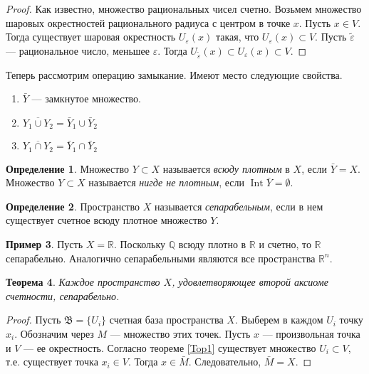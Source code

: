 \documentclass[12pt, titlepage, oneside]{amsbook}
\newcommand{\Int}{\operatorname{Int}}
\newcommand{\RR}{\mathbb{R}}
\newcommand{\QQ}{\mathbb{Q}}
\newcommand{\BBB}{\mathfrak{B}}
\newtheorem{theorem}{Теорема}[chapter]
\theoremstyle{definition}
\newtheorem{example}[theorem]{Пример}
\newtheorem{definition}[theorem]{Определение}
\theoremstyle{remark}
\begin{document}
\begin{proof}
	Как известно, множество рациональных чисел счетно. Возьмем множество шаровых окрестностей рационального радиуса с центром в точке $x$. Пусть $x\in V$. Тогда существует шаровая окрестность $U_{\varepsilon}(x)$ такая, что $U_{\varepsilon}(x)\subset V$. Пусть $\tilde{\varepsilon}$ --- рациональное число, меньшее $\varepsilon$. Тогда $U_{\tilde{\varepsilon}}(x)\subset U_{\varepsilon}(x)\subset V$.
\end{proof}

Теперь рассмотрим операцию замыкание. Имеют место следующие свойства.
\begin{enumerate}
	\item $\bar{Y}$ --- замкнутое множество.
	\item $\overline{Y_1\cup Y_2}=\bar{Y}_1\cup\bar{Y}_2$
	\item $\overline{Y_1\cap Y_2}=\bar{Y}_1\cap\bar{Y}_2$
\end{enumerate}

\begin{definition}
	Множество $Y\subset X$ называется \emph{всюду плотным} в $X$, если $\bar{Y}=X$. Множество $Y\subset X$ называется \emph{нигде не плотным}, если $\Int\bar{Y}=\emptyset$.
\end{definition}

\begin{definition}
	Пространство $X$ называется \emph{сепарабельным}, если в нем существует счетное всюду плотное множество $Y$.
\end{definition}

\begin{example}
	Пусть $X=\RR$. Поскольку $\QQ$ всюду плотно в $\RR$ и счетно, то $\RR$ сепарабельно. Аналогично сепарабельными являются все пространства $\RR^n$.
\end{example}

\begin{theorem}
	\label{Met7}
	Каждое пространство $X$, удовлетворяющее второй аксиоме счетности, сепарабельно.
\end{theorem}

\begin{proof}
	Пусть $\BBB=\{U_i\}$ счетная база пространства $X$. Выберем в каждом $U_i$ точку $x_i$. Обозначим через $M$ --- множество этих точек. Пусть $x$ --- произвольная точка и $V$ --- ее окрестность. Согласно теореме \ref{Top1} существует множество $U_i\subset V$, т.е. существует точка $x_i\in V$. Тогда $x\in\bar{M}$. Следовательно, $\bar{M}=X$.
\end{proof}
\end{document}
